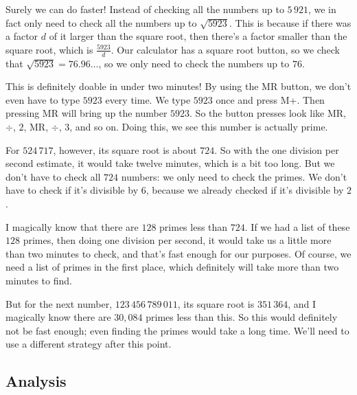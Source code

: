 \documentclass[11pt,paper=letter]{scrartcl}
\begin{document}
Surely we can do faster! Instead of checking all the numbers up to $5\,921$, we in fact only need to check all the numbers up to $\sqrt{5923}$. This is because if there was a factor $d$ of it larger than the square root, then there's a factor smaller than the square root, which is $\frac{5923}{d}$. Our calculator has a square root button, so we check that $\sqrt{5923} = 76.96\ldots$, so we only need to check the numbers up to $76$.

This is definitely doable in under two minutes! By using the MR button, we don't even have to type $5923$ every time. We type $5923$ once and press M+. Then pressing MR will bring up the number $5923$. So the button presses look like MR, $\div$, $2$, MR, $\div$, $3$, and so on. Doing this, we see this number is actually prime.

For $524\,717$, however, its square root is about $724$. So with the one division per second estimate, it would take twelve minutes, which is a bit too long. But we don't have to check all $724$ numbers: we only need to check the primes. We don't have to check if it's divisible by $6$, because we already checked if it's divisible by $2$.

I magically know that there are $128$ primes less than $724$. If we had a list of these $128$ primes, then doing one division per second, it would take us a little more than two minutes to check, and that's fast enough for our purposes. Of course, we need a list of primes in the first place, which definitely will take more than two minutes to find.

But for the next number, $123\,456\,789\,011$, its square root is $351\,364$, and I magically know there are $30,084$ primes less than this. So this would definitely not be fast enough; even finding the primes would take a long time. We'll need to use a different strategy after this point.

\subsection{Analysis}
\end{document}
